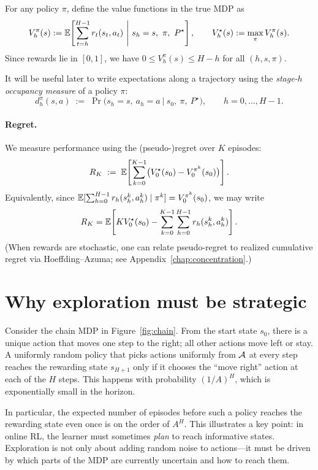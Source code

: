 For any policy $\pi$, define the value functions in the true MDP as
\[
V_h^\pi(s)
:= \E\!\left[\sum_{t=h}^{H-1} r_t(s_t,a_t)\ \middle|\ s_h=s,\ \pi,\ P^\star \right],
\qquad
V_h^\star(s):=\max_\pi V_h^\pi(s).
\]
Since rewards lie in $[0,1]$, we have $0\le V_h^\pi(s)\le H-h$ for all $(h,s,\pi)$.

It will be useful later to write expectations along a trajectory using the
\emph{stage-$h$ occupancy measure} of a policy $\pi$:
\[
d_h^\pi(s,a)
\;:=\;
\Pr\!\big(s_h=s,\ a_h=a \ \big|\ s_0,\ \pi,\ P^\star\big),
\qquad h=0,\dots,H-1.
\]

\paragraph{Regret.}
We measure performance using the (pseudo-)regret over $K$ episodes:
\[
R_K
\;:=\;
\mathbb{E}\!\left[\sum_{k=0}^{K-1} \bigl(V_0^\star(s_0)-V_0^{\pi^k}(s_0)\bigr)\right].
\]
Equivalently, since $\mathbb{E}[\sum_{h=0}^{H-1} r_h(s_h^k,a_h^k)\mid \pi^k]=V_0^{\pi^k}(s_0)$,
we may write
\[
R_K
=
\mathbb{E}\!\left[ K V_0^\star(s_0) - \sum_{k=0}^{K-1}\sum_{h=0}^{H-1} r_h(s_h^k,a_h^k)\right].
\]
(When rewards are stochastic, one can relate pseudo-regret to realized cumulative regret
via Hoeffding--Azuma; see Appendix~\ref{chap:concentration}.)

\section{Why exploration must be strategic}
\label{sec:tabular_need_strategic}


Consider the chain MDP in Figure~\ref{fig:chain}. From the start state $s_0$, there is a
unique action that moves one step to the right; all other actions move left or stay.
A uniformly random policy that picks actions uniformly from $\mathcal{A}$ at every step reaches
the rewarding state $s_{H+1}$ only if it chooses the ``move right'' action at each of
the $H$ steps. This happens with probability $(1/A)^H$, which is exponentially small
in the horizon.

In particular, the expected number of episodes before such a policy reaches the rewarding
state even once is on the order of $A^H$. This illustrates a key point: in online RL,
the learner must sometimes \emph{plan} to reach informative states. Exploration is not
only about adding random noise to actions---it must be driven by which parts of the MDP
are currently uncertain and how to reach them.


